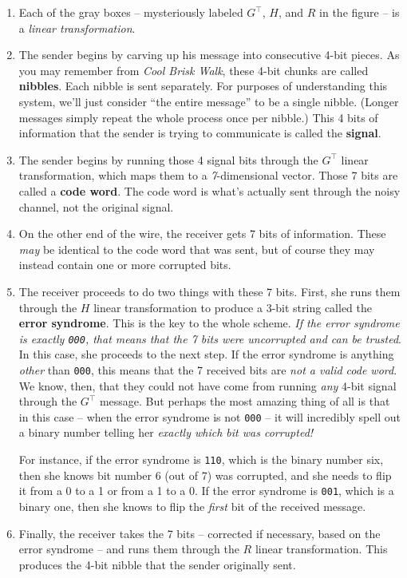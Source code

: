 \begin{enumerate}

\item Each of the gray boxes -- mysteriously labeled $G^\intercal$, $H$, and $R$ in the
figure -- is a \textit{linear transformation}.

\item The sender begins by carving up his message into consecutive 4-bit pieces.
 As you may remember from \textit{Cool Brisk Walk}, these 4-bit chunks are
called \textbf{nibbles}. Each nibble is sent separately. For purposes of
understanding this system, we'll just consider ``the entire message'' to be a
single nibble. (Longer messages simply repeat the whole process once per
nibble.) This 4 bits of information that the sender is trying to communicate is
called the \textbf{signal}.

\item The sender begins by running those 4 signal bits through the
$G^\intercal$ linear transformation, which maps them to a
\textit{7}-dimensional vector. Those 7 bits are called a \textbf{code word}.
The code word is what's actually sent through the noisy channel, not the
original signal.


\item On the other end of the wire, the receiver gets 7 bits of information.
These \textit{may} be identical to the code word that was sent, but of course
they may instead contain one or more corrupted bits.

\item The receiver proceeds to do two things with these 7 bits. First, she runs
them through the $H$ linear transformation to produce a 3-bit string called the
\textbf{error syndrome}. This is the key to the whole scheme. \textit{If the
error syndrome is exactly \texttt{000}, that means that the 7 bits were
uncorrupted and can be trusted}. In this case, she proceeds to the next step.
If the error syndrome is anything \textit{other} than \texttt{000}, this means
that the 7 received bits are \textit{not a valid code word}. We know, then, that
they could not have come from running \textit{any} 4-bit signal through the
$G^\intercal$ message. But perhaps the most amazing thing of all is that in
this case -- when the error syndrome is not \texttt{000} -- it will incredibly
spell out a binary number telling her \textit{exactly which bit was corrupted!}

For instance, if the error syndrome is \texttt{110}, which is the binary number
six, then she knows bit number 6 (out of 7) was corrupted, and she needs to
flip it from a 0 to a 1 or from a 1 to a 0. If the error syndrome is
\texttt{001}, which is a binary one, then she knows to flip the \textit{first}
bit of the received message.

\item Finally, the receiver takes the 7 bits -- corrected if necessary, based
on the error syndrome -- and runs them through the $R$ linear transformation.
This produces the 4-bit nibble that the sender originally sent.

\end{enumerate}

